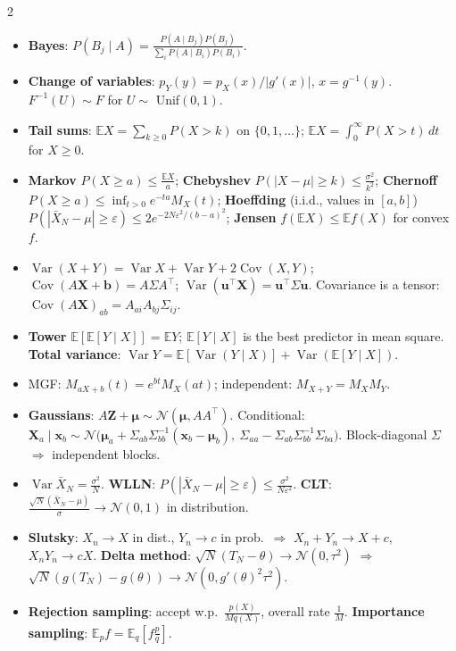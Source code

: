 \documentclass[10pt]{article}
\newcommand{\E}{\mathbb{E}}
\DeclareMathOperator{\Var}{Var}
\DeclareMathOperator{\Cov}{Cov}
\newcommand{\topic}[1]{\par\smallskip\noindent{\color{blue!50!black}\textbf{#1}}\par}
\begin{document}
\begin{multicols}{2}
\topic{Probability}
\begin{itemize}
    \item \textbf{Bayes}: $P(B_j \mid A) = \frac{P(A \mid B_j)P(B_j)}{\sum_iP(A \mid B_i)P(B_i)}$.
    \item \textbf{Change of variables}: $p_Y(y) = p_X(x)/|g'(x)|$, $x = g^{-1}(y)$. $F^{-1}(U) \sim F$ for $U \sim$ Unif$(0, 1)$.
    \item \textbf{Tail sums}: $\E X = \sum_{k \geq 0}P(X > k)$ on $\{0, 1, \ldots\}$; $\E X = \int_0^\infty P(X > t)\,dt$ for $X \geq 0$.
    \item \textbf{Markov} $P(X \geq a) \leq \frac{\E X}{a}$; \textbf{Chebyshev} $P(|X - \mu| \geq k) \leq \frac{\sigma^2}{k^2}$; \textbf{Chernoff} $P(X \geq a) \leq \inf_{t > 0}e^{-ta}M_X(t)$; \textbf{Hoeffding} (i.i.d., values in $[a, b]$) $P(|\bar X_N - \mu| \geq \varepsilon) \leq 2e^{-2N\varepsilon^2/(b - a)^2}$; \textbf{Jensen} $f(\E X) \leq \E f(X)$ for convex $f$.
    \item $\Var(X + Y) = \Var X + \Var Y + 2\Cov(X, Y)$; $\Cov(A\mathbf{X} + \mathbf{b}) = A\Sigma A^\top$; $\Var(\mathbf{u}^\top\mathbf{X}) = \mathbf{u}^\top\Sigma\mathbf{u}$. Covariance is a tensor: $\Cov(A\mathbf{X})_{ab} = A_{ai}A_{bj}\Sigma_{ij}$.
    \item \textbf{Tower} $\E[\E[Y \mid X]] = \E Y$; $\E[Y \mid X]$ is the best predictor in mean square. \textbf{Total variance}: $\Var Y = \E[\Var(Y \mid X)] + \Var(\E[Y \mid X])$.
    \item MGF: $M_{aX + b}(t) = e^{bt}M_X(at)$; independent: $M_{X+Y} = M_XM_Y$.
    \item \textbf{Gaussians}: $A\mathbf{Z} + \boldsymbol\mu \sim \mathcal{N}(\boldsymbol\mu, AA^\top)$. Conditional: $\mathbf{X}_a \mid \mathbf{x}_b \sim \mathcal{N}\big(\boldsymbol\mu_a + \Sigma_{ab}\Sigma_{bb}^{-1}(\mathbf{x}_b - \boldsymbol\mu_b), \ \Sigma_{aa} - \Sigma_{ab}\Sigma_{bb}^{-1}\Sigma_{ba}\big)$. Block-diagonal $\Sigma$ $\Rightarrow$ independent blocks.
    \item $\Var\bar X_N = \frac{\sigma^2}{N}$. \textbf{WLLN}: $P(|\bar X_N - \mu| \geq \varepsilon) \leq \frac{\sigma^2}{N\varepsilon^2}$. \textbf{CLT}: $\frac{\sqrt N(\bar X_N - \mu)}{\sigma} \to \mathcal{N}(0, 1)$ in distribution.
    \item \textbf{Slutsky}: $X_n \to X$ in dist., $Y_n \to c$ in prob.\ $\Rightarrow$ $X_n + Y_n \to X + c$, $X_nY_n \to cX$. \textbf{Delta method}: $\sqrt N(T_N - \theta) \to \mathcal{N}(0, \tau^2)$ $\Rightarrow$ $\sqrt N(g(T_N) - g(\theta)) \to \mathcal{N}(0, g'(\theta)^2\tau^2)$.
    \item \textbf{Rejection sampling}: accept w.p.\ $\frac{p(X)}{Mq(X)}$, overall rate $\frac{1}{M}$. \textbf{Importance sampling}: $\E_p f = \E_q[f\frac{p}{q}]$.
\end{itemize}


\end{multicols}
\end{document}
